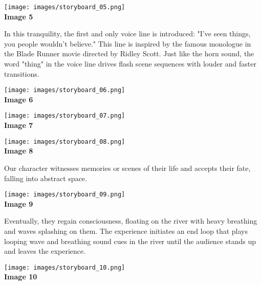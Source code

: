        \begin{center}
            \texttt{[image: images/storyboard\_05.png]}\\
            \textbf{Image 5}
        \end{center}

        In this tranquility, the first and only voice line is introduced: "I've seen things, you people wouldn't believe." This line is inspired by the famous monologue in the Blade Runner movie directed by Ridley Scott. Just like the horn sound, the word "thing" in the voice line drives flash scene sequences with louder and faster transitions.\par

        \begin{center}
            \texttt{[image: images/storyboard\_06.png]}\\
            \textbf{Image 6}
        \end{center}

        \begin{center}
            \texttt{[image: images/storyboard\_07.png]}\\
            \textbf{Image 7}
        \end{center}

        \begin{center}
            \texttt{[image: images/storyboard\_08.png]}\\
            \textbf{Image 8}
        \end{center}

        Our character witnesses memories or scenes of their life and accepts their fate, falling into abstract space.\par

        \begin{center}
            \texttt{[image: images/storyboard\_09.png]}\\
            \textbf{Image 9}
        \end{center}

        Eventually, they regain consciousness, floating on the river with heavy breathing and waves splashing on them. The experience initiates an end loop that plays looping wave and breathing sound cues in the river until the audience stands up and leaves the experience.\par

        \begin{center}
            \texttt{[image: images/storyboard\_10.png]}\\
            \textbf{Image 10}
        \end{center}

